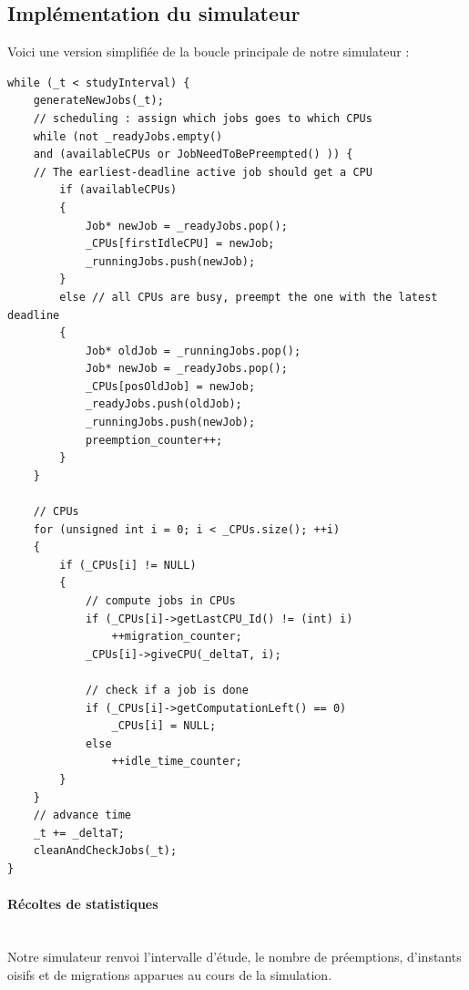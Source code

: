 \documentclass[a4paper,10pt]{article}
\begin{document}
	\subsection{Implémentation du simulateur}
		Voici une version simplifiée de la boucle principale de notre simulateur :
		\begin{lstlisting}
while (_t < studyInterval) {
	generateNewJobs(_t);
	// scheduling : assign which jobs goes to which CPUs
	while (not _readyJobs.empty()
	and (availableCPUs or JobNeedToBePreempted() )) {
	// The earliest-deadline active job should get a CPU
		if (availableCPUs)
		{
			Job* newJob = _readyJobs.pop();
			_CPUs[firstIdleCPU] = newJob;
			_runningJobs.push(newJob);
		}
		else // all CPUs are busy, preempt the one with the latest deadline
		{
			Job* oldJob = _runningJobs.pop();
			Job* newJob = _readyJobs.pop();
			_CPUs[posOldJob] = newJob;
			_readyJobs.push(oldJob);
			_runningJobs.push(newJob);
			preemption_counter++;
		}
	}

	// CPUs
	for (unsigned int i = 0; i < _CPUs.size(); ++i)
	{
		if (_CPUs[i] != NULL)
		{
			// compute jobs in CPUs
			if (_CPUs[i]->getLastCPU_Id() != (int) i)
				++migration_counter;
			_CPUs[i]->giveCPU(_deltaT, i);
			
			// check if a job is done
			if (_CPUs[i]->getComputationLeft() == 0)
				_CPUs[i] = NULL;
			else
				++idle_time_counter;
		}
	}
	// advance time
	_t += _deltaT;
	cleanAndCheckJobs(_t);
}
\end{lstlisting}
\fontfamily{}

		\paragraph*{Récoltes de statistiques}~\\
			Notre simulateur renvoi l'intervalle d'étude, le nombre de préemptions, d'instants oisifs et de migrations apparues au cours de la simulation.
		

	
\end{document}
